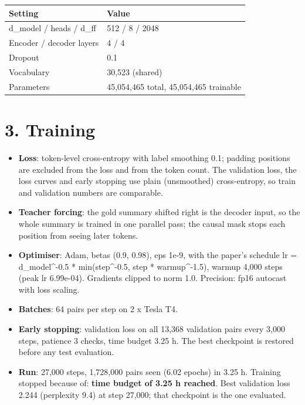 \documentclass[10pt,a4paper]{article}
\providecommand{\tightlist}{\setlength{\itemsep}{0pt}\setlength{\parskip}{0pt}}
\begin{document}
\begin{longtable}[]{@{}ll@{}}
\toprule\noalign{}
Setting & Value \\
\midrule\noalign{}
\endhead
\bottomrule\noalign{}
\endlastfoot
d\_model / heads / d\_ff & 512 / 8 / 2048 \\
Encoder / decoder layers & 4 / 4 \\
Dropout & 0.1 \\
Vocabulary & 30,523 (shared) \\
Parameters & 45,054,465 total, 45,054,465 trainable \\
\end{longtable}

\hypertarget{training}{%
\section{3. Training}\label{training}}

\begin{itemize}
\tightlist
\item
  \textbf{Loss}: token-level cross-entropy with label smoothing 0.1; padding positions are excluded from the loss and from the token count. The validation loss, the loss curves and early stopping use plain (unsmoothed) cross-entropy, so train and validation numbers are comparable.
\item
  \textbf{Teacher forcing}: the gold summary shifted right is the decoder input, so the whole summary is trained in one parallel pass; the causal mask stops each position from seeing later tokens.
\item
  \textbf{Optimiser}: Adam, betas (0.9, 0.98), eps 1e-9, with the paper's schedule lr = d\_model\^{}-0.5 * min(step\^{}-0.5, step * warmup\^{}-1.5), warmup 4,000 steps (peak lr 6.99e-04). Gradients clipped to norm 1.0. Precision: fp16 autocast with loss scaling.
\item
  \textbf{Batches}: 64 pairs per step on 2 x Tesla T4.
\item
  \textbf{Early stopping}: validation loss on all 13,368 validation pairs every 3,000 steps, patience 3 checks, time budget 3.25 h. The best checkpoint is restored before any test evaluation.
\item
  \textbf{Run}: 27,000 steps, 1,728,000 pairs seen (6.02 epochs) in 3.25 h. Training stopped because of: \textbf{time budget of 3.25 h reached}. Best validation loss 2.244 (perplexity 9.4) at step 27,000; that checkpoint is the one evaluated.
\end{itemize}
\end{document}
